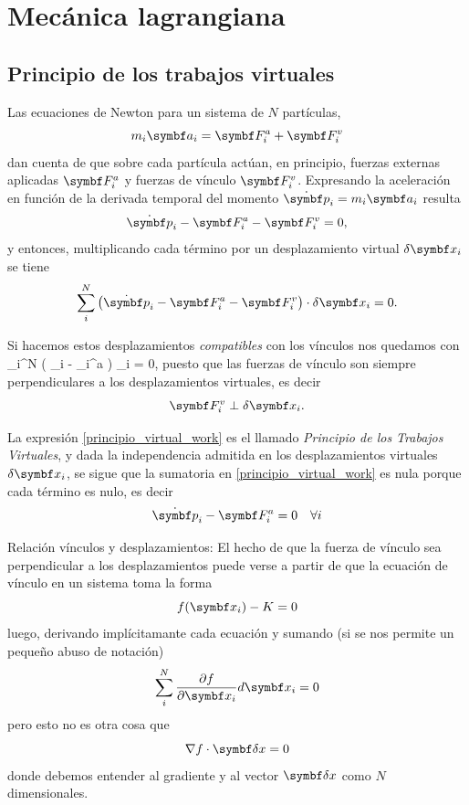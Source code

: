 \documentclass[10pt,oneside]{CBFT_book}
\begin{document}
\chapter{Mecánica lagrangiana}

\section{Principio de los trabajos virtuales}
Las ecuaciones de Newton para un sistema de $N$ partículas,
\[
	m_i \vb{a}_i = \vb{F}_i^a + \vb{F}_i^v
\]
dan cuenta de que sobre cada partícula actúan, en principio, fuerzas externas aplicadas $ \vb{F}_i^a $
y fuerzas de vínculo $ \vb{F}_i^v $. Expresando la aceleración en función de la derivada temporal del momento  
$ \dot{\vb{p}}_i = m_i \vb{a}_i$ resulta 
\[
	\dot{\vb{p}}_i - \vb{F}_i^a - \vb{F}_i^v = 0,
\]
y entonces, multiplicando cada término por un desplazamiento virtual $ \delta\vb{x}_i $ se tiene
\[
	\sum_i^N \left( \dot{\vb{p}}_i - \vb{F}_i^a - \vb{F}_i^v \right) \cdot \delta\vb{x}_i  = 0.
\]

Si hacemos estos desplazamientos {\it compatibles} con los vínculos nos quedamos con
\be
	\sum_i^N \left( _i - _i^a \right) \cdot \delta{}_i = 0,
	\label{principio_virtual_work}
\ee
puesto que las fuerzas de vínculo son siempre perpendiculares a los desplazamientos virtuales, es decir 
\[
	\vb{F}_i^v \perp \delta\vb{x}_i.
\]

La expresión \eqref{principio_virtual_work} es el llamado {\it Principio de los Trabajos Virtuales},
y dada la independencia admitida en los desplazamientos virtuales $ \delta \vb{x}_i $, se sigue que la
sumatoria en \eqref{principio_virtual_work} es nula porque cada término es nulo, es decir
\[
	\dot{\vb{p}}_i - \vb{F}_i^a = 0 \quad \forall i
\]

\begin{notas}{Relación vínculos y desplazamientos:}
El hecho de que la fuerza de vínculo sea perpendicular a los desplazamientos puede
verse a partir de que la ecuación de vínculo en un sistema toma la forma
\[
	f(\vb{x}_i) - K = 0 
\]
luego, derivando implícitamante cada ecuación y sumando (si se nos permite un pequeño
abuso de notación)
\[
	\sum_i^N \dpar{f}{\vb{x}_i} d\vb{x}_i = 0 
\]
pero esto no es otra cosa que
\[
	\nabla f \cdot \vb{\delta x} = 0
\]
donde debemos entender al gradiente y al vector $\vb{\delta x}$ como $N$ dimensionales.
\end{notas}
\end{document}
